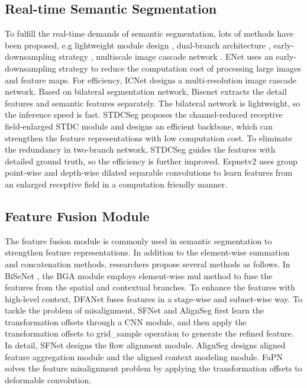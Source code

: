 \documentclass[10pt,twocolumn,letterpaper]{article}
\begin{document}
\subsection{Real-time Semantic Segmentation}

To fulfill the real-time demands of semantic segmentation, lots of methods have been proposed, e.g lightweight module design \cite{fan2021rethinking, mehta2019espnetv2}, dual-branch architecture \cite{yu2018bisenet, yu2021bisenet}, early-downsampling strategy \cite{paszke2016enet}, multiscale image cascade network \cite{zhao2018icnet}.
ENet \cite{paszke2016enet} uses an early-downsampling strategy to reduce the computation cost of processing large images and feature maps.
For efficiency, ICNet \cite{zhao2018icnet} designs a multi-resolution image cascade network.
Based on bilateral segmentation network, Bisenet \cite{yu2021bisenet} extracts the detail features and semantic features separately. The bilateral network is lightweight, so the inference speed is fast.
STDCSeg \cite{fan2021rethinking} proposes the channel-reduced receptive field-enlarged STDC module and designs an efficient backbone, which can strengthen the feature representations with low computation cost. To eliminate the redundancy in two-branch network, STDCSeg guides the features with detailed ground truth, so the efficiency is further improved.
Espnetv2\cite{mehta2019espnetv2} uses group point-wise and depth-wise dilated separable convolutions to learn features from an enlarged receptive field in a computation friendly manner.

\subsection{Feature Fusion Module}
The feature fusion module is commonly used in semantic segmentation to strengthen feature representations.
In addition to the element-wise summation and concatenation methods, researchers propose several methods as follows.
In BiSeNet \cite{yu2021bisenet}, the BGA module employs element-wise mul method to fuse the features from the spatial and contextual branches.
To enhance the features with high-level context, DFANet \cite{li2019dfanet} fuses features in a stage-wise and subnet-wise way.
To tackle the problem of misalignment, SFNet \cite{li2020semantic} and AlignSeg \cite{huang2021alignseg} first learn the transformation offsets through a CNN module, and then apply the transformation offsets to grid\_sample operation to generate the refined feature.
In detail, SFNet designs the flow alignment module.
AlignSeg designs aligned feature aggregation module and the aligned context modeling module.
FaPN \cite{huang2021fapn} solves the feature misalignment problem by applying the transformation offsets to deformable convolution.
\end{document}
